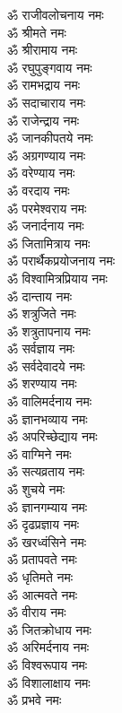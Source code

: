\begin{multicols}{2}
\begin{flushleft}
ॐ राजीवलोचनाय नमः\\
ॐ श्रीमते नमः\\
ॐ श्रीरामाय नमः\\
ॐ रघुपुङ्गवाय नमः\\
ॐ रामभद्राय नमः\\
ॐ सदाचाराय नमः\\
ॐ राजेन्द्राय नमः\\
ॐ जानकीपतये नमः\\
ॐ अग्रगण्याय नमः\\
ॐ वरेण्याय नमः\hfill{}\\
ॐ वरदाय नमः\\
ॐ परमेश्वराय नमः\\
ॐ जनार्दनाय नमः\\
ॐ जितामित्राय नमः\\
ॐ परार्थैकप्रयोजनाय नमः\\
ॐ विश्वामित्रप्रियाय नमः\\
ॐ दान्ताय नमः\\
ॐ शत्रुजिते नमः\\
ॐ शत्रुतापनाय नमः\\
ॐ सर्वज्ञाय नमः\hfill{}\\
ॐ सर्वदेवादये नमः\\
ॐ शरण्याय नमः\\
ॐ वालिमर्दनाय नमः\\
ॐ ज्ञानभव्याय नमः\\
ॐ अपरिच्छेद्याय नमः\\
ॐ वाग्मिने नमः\\
ॐ सत्यव्रताय नमः\\
ॐ शुचये नमः\\
ॐ ज्ञानगम्याय नमः\\
ॐ दृढप्रज्ञाय नमः\hfill{}\\
ॐ खरध्वंसिने नमः\\
ॐ प्रतापवते नमः\\
ॐ धृतिमते नमः\\
ॐ आत्मवते नमः\\
ॐ वीराय नमः\\
ॐ जितक्रोधाय नमः\\
ॐ अरिमर्दनाय नमः\\
ॐ विश्वरूपाय नमः\\
ॐ विशालाक्षाय नमः\\
ॐ प्रभवे नमः\hfill{}\\

\end{flushleft}
\end{multicols}
